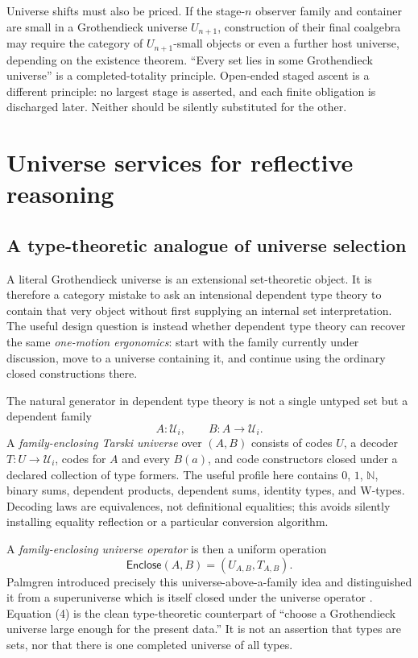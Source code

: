 \documentclass[11pt]{article}
\theoremstyle{definition}
\theoremstyle{remark}
\begin{document}
Universe shifts must also be priced.  If the stage-$n$ observer family and
container are small in a Grothendieck universe $U_{n+1}$, construction of their
final coalgebra may require the category of $U_{n+1}$-small objects or even a
further host universe, depending on the existence theorem.  ``Every set lies in
some Grothendieck universe'' is a completed-totality principle.  Open-ended
staged ascent is a different principle: no largest stage is asserted, and each
finite obligation is discharged later.  Neither should be silently substituted
for the other.

\section{Universe services for reflective reasoning}

\subsection{A type-theoretic analogue of universe selection}

A literal Grothendieck universe is an extensional set-theoretic object.  It is
therefore a category mistake to ask an intensional dependent type theory to
contain that very object without first supplying an internal set interpretation.
The useful design question is instead whether dependent type theory can recover
the same \emph{one-motion ergonomics}: start with the family currently under
discussion, move to a universe containing it, and continue using the ordinary
closed constructions there.

The natural generator in dependent type theory is not a single untyped set but a
dependent family
\[
  A:\mathcal U_i,
  \qquad B:A\to\mathcal U_i.
\]
A \emph{family-enclosing Tarski universe} over $(A,B)$ consists of codes $U$,
a decoder $T:U\to\mathcal U_i$, codes for $A$ and every $B(a)$, and code
constructors closed under a declared collection of type formers.  The useful
profile here contains $0$, $1$, $\mathbb N$, binary sums, dependent products,
dependent sums, identity types, and W-types.  Decoding laws are equivalences,
not definitional equalities; this avoids silently installing equality reflection
or a particular conversion algorithm.

A \emph{family-enclosing universe operator} is then a uniform operation
\[
  \mathsf{Enclose}(A,B)=(U_{A,B},T_{A,B}).                \tag{4}
\]
Palmgren introduced precisely this universe-above-a-family idea and distinguished
it from a superuniverse which is itself closed under the universe operator
\cite{PalmgrenUniverses}.  Equation (4) is the clean type-theoretic counterpart
of ``choose a Grothendieck universe large enough for the present data.''  It is
not an assertion that types are sets, nor that there is one completed universe
of all types.
\end{document}
